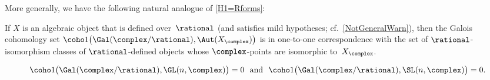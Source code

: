 More generally, we have the following natural analogue of \cref{H1=Rforms}:

\begin{obs} \label{H1=Qforms}
\normalfont If $X$ is an algebraic object that is defined over~$\rational$ (and satisfies mild hypotheses; cf.\ \cref{NotGeneralWarn}), then the Galois cohomology set $\coho1\bigl( \Gal(\complex/\rational), \Aut(X_\complex) \bigr)$ is in one-to-one correspondence with the set of $\rational$-isomorphism classes of $\rational$-defined objects whose $\complex$-points are isomorphic to~$X_\complex$.
\end{obs}

\begin{cor}[\ccf{H1SL=0}]
$$ \text{$\coho1\bigl( \Gal(\complex/\rational), \GL(n,\complex) \bigr) = 0$
\ and \  $\coho1\bigl( \Gal(\complex/\rational), \SL(n,\complex) \bigr) = 0$.} $$
\end{cor}

